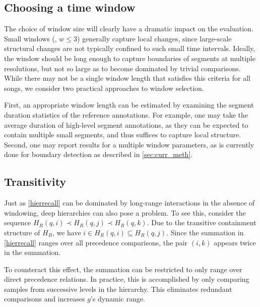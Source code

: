\documentclass{article}
\begin{document}
\subsection{Choosing a time window}

The choice of window size will clearly have a dramatic impact on the evaluation.
Small windows (\eg, $w \leq 3$) generally capture local changes, since large-scale structural changes are not typically confined to such small time intervals.
Ideally, the window should be long enough to capture boundaries of segments at multiple resolutions, but not so large as to become dominated by trivial comparisons.
While there may not be a single window length that satisfies this criteria for all songs, we consider two practical approaches to window selection.

First, an appropriate window length can be estimated by examining the segment duration statistics of the reference annotations.  
For example, one may take the average duration of high-level segment annotations, as they can be expected to contain multiple small segments, and thus suffices to capture local structure.
Second, one may report results for a multiple window parameters, as is currently done for boundary detection as described in \cref{sec:curr_meth}.  



\subsection{Transitivity}

Just as \cref{hierrecall} can be dominated by long-range interactions in the absence
of windowing, deep hierarchies can also pose a problem.  To see this, consider the 
sequence $H_R(q, i) \prec H_R(q, j) \prec H_R(q, k)$.  Due to the transitive
containment structure of $H_R$, we have $i \in H_R(q, i) \subseteq H_R(q, j)$.
Since the summation in \cref{hierrecall} ranges over all precedence comparisons, the
pair $(i, k)$ appears twice in the summation.  

To counteract this effect, the summation can be restricted to only range over direct
precedence relations.  In practice, this is accomplished by only comparing samples from
successive levels in the hierarchy.  This eliminates redundant comparisons and increases 
$g$'s dynamic range.
\end{document}

